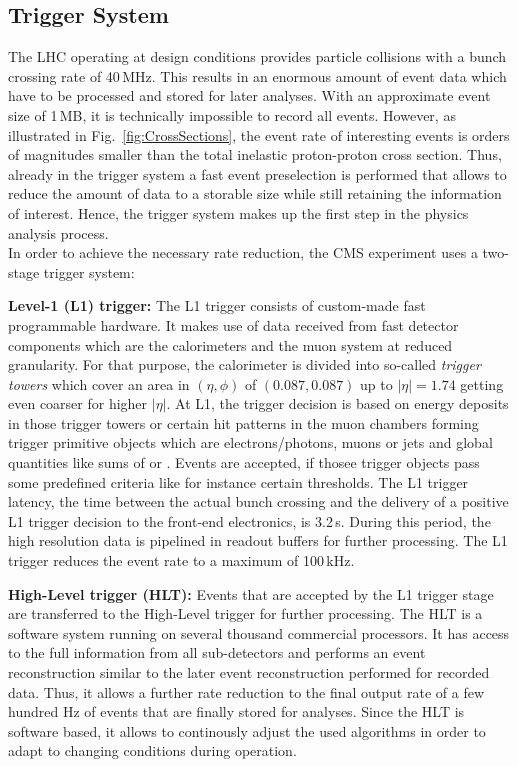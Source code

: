 \subsection{Trigger System}
\label{subsec:cms_trigger}
The LHC operating at design conditions provides particle collisions with a bunch crossing rate of 40\,MHz. This results in an enormous amount of event data which have to be processed and stored for later analyses. With an approximate event size of 1\,MB, it is technically impossible to record all events. However, as illustrated in Fig.~\ref{fig:CrossSections}, the event rate of interesting events is orders of magnitudes smaller than the total inelastic proton-proton cross section. Thus, already in the trigger system a fast event preselection is performed that allows to reduce the amount of data to a storable size while still retaining the information of interest. Hence, the trigger system makes up the first step in the physics analysis process.\\
In order to achieve the necessary rate reduction, the CMS experiment uses a two-stage trigger system:
\begin{description}
\item \textbf{Level-1 (L1) trigger:} The L1 trigger consists of custom-made fast programmable hardware. It makes use of data received from fast detector components which are the calorimeters and the muon system at reduced granularity. For that purpose, the calorimeter is divided into so-called \textit{trigger towers} which cover an area in $(\eta, \phi)$ of $(0.087, 0.087)$ up to $|\eta| = 1.74$ getting even coarser for higher $|\eta|$. At L1, the trigger decision is based on energy deposits in those trigger towers or certain hit patterns in the muon chambers forming trigger primitive objects which are electrons/photons, muons or jets and global quantities like sums of \et or \met. Events are accepted, if thosee trigger objects pass some predefined criteria like for instance certain \pt thresholds. The L1 trigger latency, \ie the time between the actual bunch crossing and the delivery of a positive L1 trigger decision to the front-end electronics, is 3.2\,\textmu s. During this period, the high resolution data is pipelined in readout buffers for further processing. The L1 trigger reduces the event rate to a maximum of 100\,kHz.
\item \textbf{High-Level trigger (HLT):} Events that are accepted by the L1 trigger stage are transferred to the High-Level trigger for further processing. The HLT is a software system running on several thousand commercial processors. It has access to the full information from all sub-detectors and performs an event reconstruction similar to the later event reconstruction performed for recorded data. Thus, it allows a further rate reduction to the final output rate of a few hundred Hz of events that are finally stored for analyses. Since the HLT is software based, it allows to continously adjust the used algorithms in order to adapt to changing conditions during operation.
\end{description}
